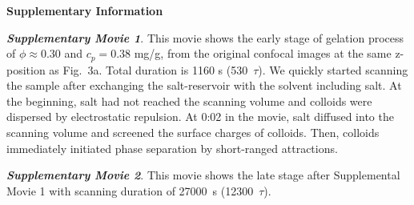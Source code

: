 \documentclass[12pt,onecolumn]{revtex4-1}
\begin{document}
\noindent
{\bf Supplementary Information}

\vspace{5mm}
\noindent
\emph{\bf Supplementary Movie 1}. This movie shows the early stage of gelation process of $\phi\approx 0.30$ and $c_p=0.38$ mg/g, from the original confocal images at the same z-position as Fig.~3a. Total duration is 1160 s (530~$\tau$). We quickly started scanning the sample after exchanging the salt-reservoir with the solvent including salt. At the beginning, salt had not reached the scanning volume and colloids were dispersed by electrostatic repulsion. At 0:02 in the movie, salt diffused into the scanning volume and screened the surface charges of colloids. Then, colloids immediately initiated phase separation by short-ranged attractions.

\vspace{5mm}
\noindent
\emph{\bf Supplementary Movie 2}.
This movie shows the late stage after Supplemental Movie 1 with scanning duration of 27000~s (12300~$\tau$).
\end{document}
